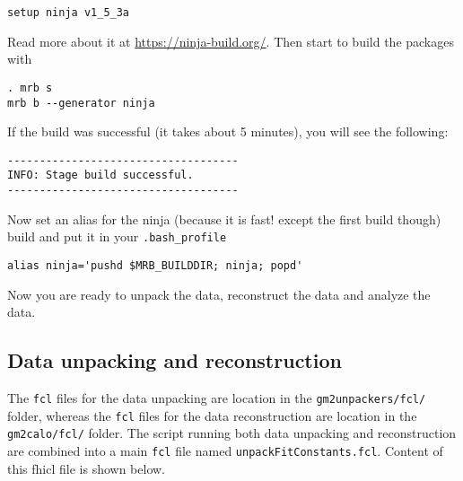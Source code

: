 %
\begin{Verbatim}[frame=single]
setup ninja v1_5_3a
\end{Verbatim}
%
Read more about it at \url{https://ninja-build.org/}.
Then start to build the packages with
%
\begin{Verbatim}[frame=single]
. mrb s
mrb b --generator ninja
\end{Verbatim}
%
If the build was successful (it takes about 5 minutes), you will see the following:
%
\begin{Verbatim}[frame=single]
------------------------------------
INFO: Stage build successful.
------------------------------------
\end{Verbatim}
%
Now set an alias for the ninja (because it is fast! except the first build though) build and put it in your \verb+.bash_profile+
%
\begin{Verbatim}[frame=single]
alias ninja='pushd $MRB_BUILDDIR; ninja; popd'
\end{Verbatim}
%
Now you are ready to unpack the data, reconstruct the data and analyze the data.

\subsection{Data unpacking and reconstruction}

The \verb+fcl+ files for the data unpacking are location in the \verb+gm2unpackers/fcl/+ folder,
whereas the \verb+fcl+ files for the data reconstruction are location in the \verb+gm2calo/fcl/+ folder.
The script running both data unpacking and reconstruction are combined into a main \verb+fcl+ file named \verb+unpackFitConstants.fcl+. Content of this fhicl file is shown below.

